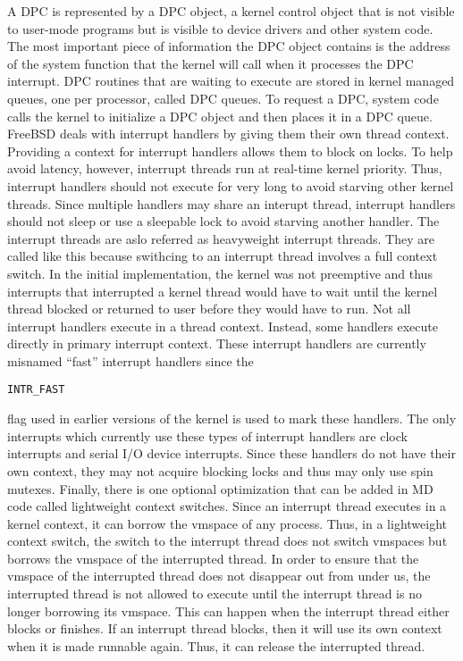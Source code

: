 \documentclass[letterpaper,10pt,draftclsnofoot,onecolumn]{IEEEtran}
\begin{document}
A DPC is represented by a DPC object, a kernel control object that is not visible to user-mode programs but is visible to device drivers and other system code. The most important piece of information the DPC object contains is the address of the system function that the kernel will call when it processes the DPC interrupt. DPC routines that are waiting to execute are stored in kernel managed queues, one per processor, called DPC queues. To request a DPC, system code calls the kernel to initialize a DPC object and then places it in a DPC queue.\cite{[1]}
FreeBSD deals with interrupt handlers by giving them their own thread context. Providing a context for interrupt handlers allows them to block on locks. To help avoid latency, however, interrupt threads run at real-time kernel priority. Thus, interrupt handlers should not execute for very long to avoid starving other kernel threads. Since multiple handlers may share an interupt thread, interrupt handlers should not sleep or use a sleepable lock to avoid starving another handler.
The interrupt threads are aslo referred as heavyweight interrupt threads. They are called like this because swithcing to an interrupt thread involves a full context switch. In the initial implementation, the kernel was not preemptive and thus interrupts that interrupted a kernel thread would have to wait until the kernel thread blocked or returned to user before they would have to run. Not all interrupt handlers execute in a thread context. Instead, some handlers execute directly in primary interrupt context. These interrupt handlers are currently misnamed “fast” interrupt handlers since the \begin{verbatim}INTR_FAST\end{verbatim} flag used in earlier versions of the kernel is used to mark these handlers. The only interrupts which currently use these types of interrupt handlers are clock interrupts and serial I/O device interrupts. Since these handlers do not have their own context, they may not acquire blocking locks and thus may only use spin mutexes.\cite{[2]}
Finally, there is one optional optimization that can be added in MD code called lightweight context switches. Since an interrupt thread executes in a kernel context, it can borrow the vmspace of any process. Thus, in a lightweight context switch, the switch to the interrupt thread does not switch vmspaces but borrows the vmspace of the interrupted thread. In order to ensure that the vmspace of the interrupted thread does not disappear out from under us, the interrupted thread is not allowed to execute until the interrupt thread is no longer borrowing its vmspace. This can happen when the interrupt thread either blocks or finishes. If an interrupt thread blocks, then it will use its own context when it is made runnable again. Thus, it can release the interrupted thread.
\end{document}
